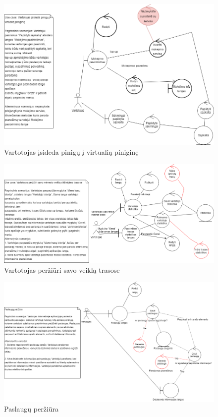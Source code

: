 \documentclass[oneside]{VUMIFPSkursinis}
\begin{document}
			\begin{figure}[h]
    				\centering
    				\includegraphics[width=1\textwidth]{rob1.png}
    				\caption{Vartotojas įsideda pinigų į virtualią piniginę}
    				\label{fig:Vartotojas įsideda pinigų į virtualią piniginę}
			\end{figure}

			\begin{figure}[h]
    				\centering
    				\includegraphics[width=1\textwidth]{rob2.png}
    				\caption{Vartotojas peržiūri savo veiklą trasose}
    				\label{fig:Vartotojas peržiūri savo veiklą trasose}
			\end{figure}

			\begin{figure}[h]
    				\centering
    				\includegraphics[width=1\textwidth]{rob4.png}
    				\caption{Paslaugų peržiūra}
    				\label{fig:Paslaugų peržiūra}
			\end{figure}
\end{document}
